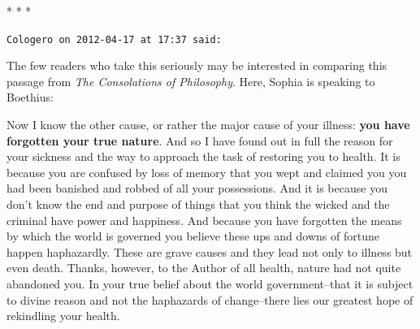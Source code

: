 
\begin{center}* * *\end{center}

\begin{footnotesize}
\begin{sffamily}
\texttt{Cologero on 2012-04-17 at 17:37 said:}

The few readers who take this seriously may be interested in comparing this passage from \textit{The Consolations of Philosophy}. Here, Sophia is speaking to Boethius:

\begin{quotex}\footnotesize

Now I know the other cause, or rather the major cause of your illness: \textbf{you have forgotten your true nature}. And so I have found out in full the reason for your sickness and the way to approach the task of restoring you to health. It is because you are confused by loss of memory that you wept and claimed you you had been banished and robbed of all your possessions. And it is because you don't know the end and purpose of things that you think the wicked and the criminal have power and happiness. And because you have forgotten the means by which the world is governed you believe these ups and downs of fortune happen haphazardly. These are grave causes and they lead not only to illness but even death. Thanks, however, to the Author of all health, nature had not quite abandoned you. In your true belief about the world government--that it is subject to divine reason and not the haphazards of change--there lies our greatest hope of rekindling your health.
\end{quotex}


\end{sffamily}
\end{footnotesize}


